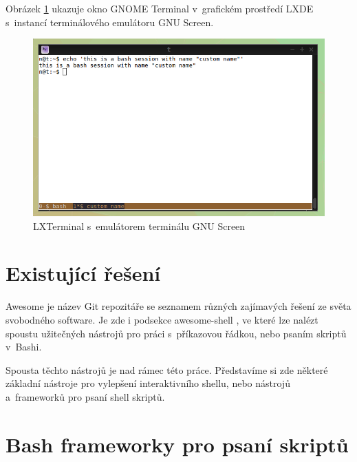 \documentclass[thesis=M,czech]{FITthesis}[2012/06/26]
\begin{document}
Obrázek \ref{fig:terminal_invert} ukazuje okno GNOME Terminal v~grafickém prostředí LXDE s~instancí terminálového emulátoru GNU Screen.

\begin{figure}[htb]\centering
	\includegraphics[width=\textwidth]{./images/terminal_invert}
	\caption{LXTerminal s~emulátorem terminálu GNU Screen}
	\label{fig:terminal_invert}
\end{figure}






\section{Existující řešení}

Awesome \cite{awesome} je název Git repozitáře se seznamem různých zajímavých řešení ze světa svobodného software. Je zde i podsekce awesome-shell \cite{awesomeshell}, ve které lze nalézt spoustu užitečných nástrojů pro práci s~příkazovou řádkou, nebo psaním skriptů v~Bashi.

Spousta těchto nástrojů je nad rámec této práce. Představíme si zde některé základní nástroje pro vylepšení interaktivního shellu, nebo nástrojů a~frameworků pro psaní shell skriptů.


\section{Bash frameworky pro psaní skriptů}
\end{document}
